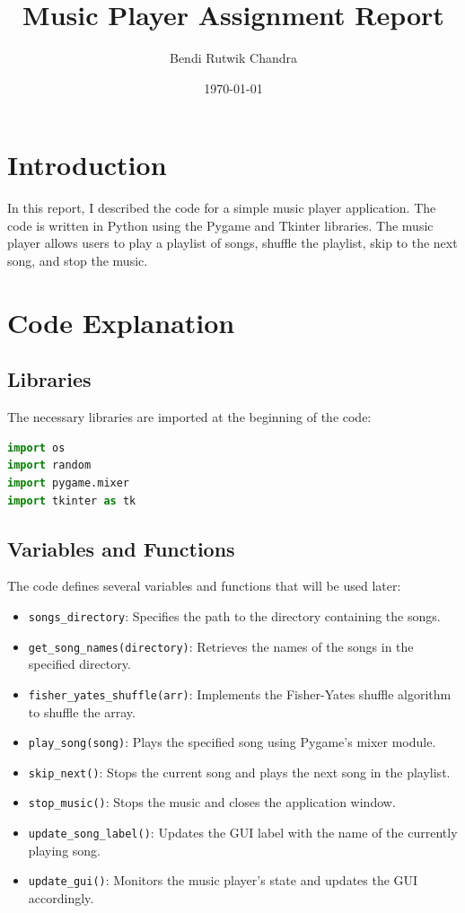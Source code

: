 \documentclass{article}
\begin{document}
\title{Music Player Assignment Report}
\author{Bendi Rutwik Chandra}
\date{\today}
\maketitle

\section{Introduction}
In this report, I described the code for a simple music player application. The code is written in Python using the Pygame and Tkinter libraries. The music player allows users to play a playlist of songs, shuffle the playlist, skip to the next song, and stop the music.

\section{Code Explanation}


\subsection{Libraries}
The necessary libraries are imported at the beginning of the code:
\begin{lstlisting}[language=Python]
import os
import random
import pygame.mixer
import tkinter as tk
\end{lstlisting}

\subsection{Variables and Functions}
The code defines several variables and functions that will be used later:
\begin{itemize}
    \item \texttt{songs\_directory}: Specifies the path to the directory containing the songs.
    \item \texttt{get\_song\_names(directory)}: Retrieves the names of the songs in the specified directory.
    \item \texttt{fisher\_yates\_shuffle(arr)}: Implements the Fisher-Yates shuffle algorithm to shuffle the array.
    \item \texttt{play\_song(song)}: Plays the specified song using Pygame's mixer module.
    \item \texttt{skip\_next()}: Stops the current song and plays the next song in the playlist.
    \item \texttt{stop\_music()}: Stops the music and closes the application window.
    \item \texttt{update\_song\_label()}: Updates the GUI label with the name of the currently playing song.
    \item \texttt{update\_gui()}: Monitors the music player's state and updates the GUI accordingly.
\end{itemize}
\end{document}
